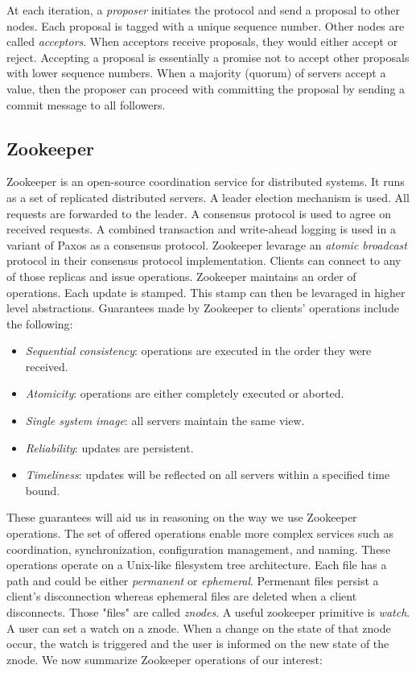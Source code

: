 At each iteration, a \emph{proposer} initiates the protocol and send a proposal to other nodes. Each proposal is tagged with a unique sequence number. Other nodes are called \emph{acceptors}. When acceptors receive proposals, they would either accept or reject. Accepting a proposal is essentially a promise not to accept other proposals with lower sequence numbers. When a majority (quorum) of servers accept a value, then the proposer can proceed with committing the proposal by sending a commit message to all followers. 

\subsection{Zookeeper}
Zookeeper is an open-source coordination service for distributed systems. It runs as a set of replicated distributed servers. A leader election mechanism is used. All requests are forwarded to the leader. A consensus protocol is used to agree on received requests. A combined transaction and write-ahead logging is used in a variant of Paxos as a consensus protocol. Zookeeper levarage an \emph{atomic broadcast} protocol in their consensus protocol implementation. Clients can connect to any of those replicas and issue operations. Zookeeper maintains an order of operations. Each update is stamped. This stamp can then be levaraged in higher level abstractions. Guarantees made by Zookeeper to clients' operations include the following:
\begin{itemize}
\item{\emph{Sequential consistency}: operations are executed in the order they were received. }
\item{\emph{Atomicity}: operations are either completely executed or aborted. }
\item{\emph{Single system image}: all servers maintain the same view. }
\item{\emph{Reliability}: updates are persistent. }
\item{\emph{Timeliness}: updates will be reflected on all servers within a specified time bound. }
\end{itemize}
These guarantees will aid us in reasoning on the way we use Zookeeper operations. The set of offered operations enable more complex services such as coordination, synchronization, configuration management, and naming. These operations operate on a Unix-like filesystem tree architecture. Each file has a path and could be either \emph{permanent} or \emph{ephemeral}. Permenant files persist a client's disconnection whereas ephemeral files are deleted when a client disconnects. Those "files" are called \emph{znodes}. A useful zookeeper primitive is \emph{watch}. A user can set a watch on a znode. When a change on the state of that znode occur, the watch is triggered and the user is informed on the new state of the znode. We now summarize Zookeeper operations of our interest:
